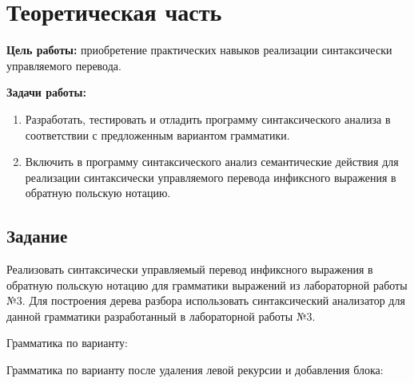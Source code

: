 \chapter{Теоретическая часть}

\textbf{Цель работы:} приобретение практических навыков реализации синтаксически управляемого перевода.

\textbf{Задачи работы:}

\begin{enumerate}
	\item Разработать, тестировать и отладить программу синтаксического анализа
          в соответствии с предложенным вариантом грамматики.
	\item Включить в программу синтаксического анализ семантические действия
          для реализации синтаксически управляемого перевода инфиксного
          выражения в обратную польскую нотацию.
\end{enumerate}

\section{Задание}

Реализовать синтаксически управляемый перевод инфиксного выражения
в обратную польскую нотацию для грамматики выражений из лабораторной
работы №3. Для построения дерева разбора использовать синтаксический
анализатор для данной грамматики разработанный в лабораторной работы №3.

Грамматика по варианту:


Грамматика по варианту после удаления левой рекурсии и добавления блока:



